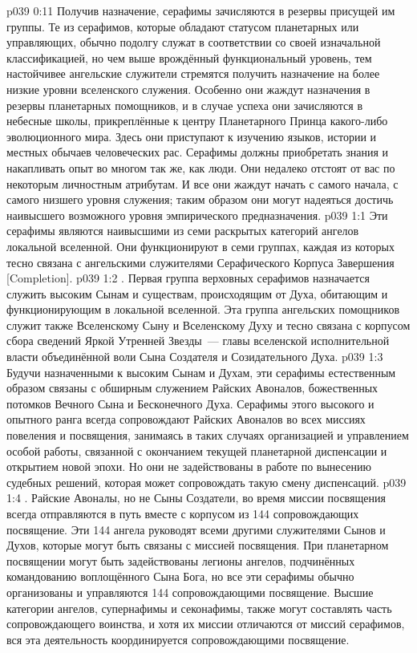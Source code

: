 \vs p039 0:11 Получив назначение, серафимы зачисляются в резервы присущей им группы. Те из серафимов, которые обладают статусом планетарных или управляющих, обычно подолгу служат в соответствии со своей изначальной классификацией, но чем выше врождённый функциональный уровень, тем настойчивее ангельские служители стремятся получить назначение на более низкие уровни вселенского служения. Особенно они жаждут назначения в резервы планетарных помощников, и в случае успеха они зачисляются в небесные школы, прикреплённые к центру Планетарного Принца какого\hyp{}либо эволюционного мира. Здесь они приступают к изучению языков, истории и местных обычаев человеческих рас. Серафимы должны приобретать знания и накапливать опыт во многом так же, как люди. Они недалеко отстоят от вас по некоторым личностным атрибутам. И все они жаждут начать с самого начала, с самого низшего уровня служения; таким образом они могут надеяться достичь наивысшего возможного уровня эмпирического предназначения.
\vs p039 1:1 Эти серафимы являются наивысшими из семи раскрытых категорий ангелов локальной вселенной. Они функционируют в семи группах, каждая из которых тесно связана с ангельскими служителями Серафического Корпуса Завершения [Completion].
\vs p039 1:2 . Первая группа верховных серафимов назначается служить высоким Сынам и существам, происходящим от Духа, обитающим и функционирующим в локальной вселенной. Эта группа ангельских помощников служит также Вселенскому Сыну и Вселенскому Духу и тесно связана с корпусом сбора сведений Яркой Утренней Звезды~--- главы вселенской исполнительной власти объединённой воли Сына Создателя и Созидательного Духа.
\vs p039 1:3 Будучи назначенными к высоким Сынам и Духам, эти серафимы естественным образом связаны с обширным служением Райских Авоналов, божественных потомков Вечного Сына и Бесконечного Духа. Серафимы этого высокого и опытного ранга всегда сопровождают Райских Авоналов во всех миссиях повеления и посвящения, занимаясь в таких случаях организацией и управлением особой работы, связанной с окончанием текущей планетарной диспенсации и открытием новой эпохи. Но они не задействованы в работе по вынесению судебных решений, которая может сопровождать такую смену диспенсаций.
\vs p039 1:4 \pc {}. Райские Авоналы, но не Сыны Создатели, во время миссии посвящения всегда отправляются в путь вместе с корпусом из 144 сопровождающих посвящение. Эти 144 ангела руководят всеми другими служителями Сынов и Духов, которые могут быть связаны с миссией посвящения. При планетарном посвящении могут быть задействованы легионы ангелов, подчинённых командованию воплощённого Сына Бога, но все эти серафимы обычно организованы и управляются 144 сопровождающими посвящение. Высшие категории ангелов, супернафимы и секонафимы, также могут составлять часть сопровождающего воинства, и хотя их миссии отличаются от миссий серафимов, вся эта деятельность координируется сопровождающими посвящение.
